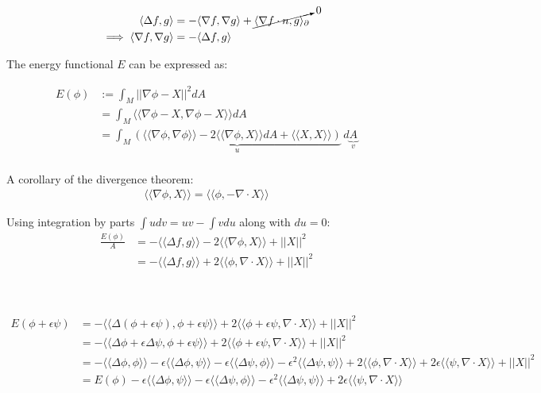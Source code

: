 \documentclass{article}
\def\grad{\nabla}
\def\lap{\Delta}
\def\nt{\notag}
\def\ll{\langle\langle}
\def\rr{\rangle\rangle}
\begin{document}
\begin{align}
    \langle \lap f, g \rangle &= -\langle \grad f, \grad g \rangle + \cancelto{0}{\langle \grad f \cdot n, g \rangle_\partial} \nt\\
    \implies \langle \grad f, \grad g \rangle &= - \langle \lap f, g \rangle
\end{align}

The energy functional $E$ can be expressed as:

\begin{align*}
    E(\phi) &:= \int_M || \grad \phi - X ||^2 dA \\
        &= \int_M \ll \grad \phi - X, \grad \phi - X \rr dA \\
        &= \int_M \underbrace{(\ll \grad \phi, \grad \phi \rr - 2 \ll \grad \phi, X \rr dA + \ll X, X \rr)}_u \, d\underbrace{A}_v \\
\end{align*}

A corollary of the divergence theorem:
\begin{align}
    \ll \grad \phi, X \rr = \ll \phi, -\grad \cdot X \rr
\end{align}

Using integration by parts $\int udv = uv - \int vdu$ along with $du = 0$:
\begin{align*}
    \frac{E(\phi)}{A} &= -\ll \lap f, g \rr - 2 \ll \grad \phi, X \rr + ||X||^2 \tag*{from (1)} \\
        &= -\ll \lap f, g \rr + 2 \ll \phi, \grad \cdot X \rr + ||X||^2 \tag*{from (2)}
\end{align*}


\vspace{1.8cm}
\\\\


\begin{align*}
    E(\phi + \epsilon \psi) &= - \ll \lap (\phi + \epsilon \psi), \phi + \epsilon \psi \rr + 2 \ll \phi + \epsilon \psi, \grad \cdot X \rr + || X ||^2 \\
        &= - \ll \lap \phi + \epsilon \lap \psi, \phi + \epsilon \psi \rr + 2 \ll \phi + \epsilon \psi, \grad \cdot X \rr + || X ||^2 \\
        &= - \ll \lap \phi, \phi \rr - \epsilon \ll \lap \phi, \psi \rr - \epsilon \ll \lap \psi, \phi \rr - \epsilon^2 \ll \lap \psi, \psi \rr + 2 \ll \phi, \grad \cdot X \rr + 2 \epsilon \ll \psi, \grad \cdot X \rr + || X ||^2 \\
        &= E(\phi) - \epsilon \ll \lap \phi, \psi \rr - \epsilon \ll \lap \psi, \phi \rr - \epsilon^2 \ll \lap \psi, \psi \rr + 2 \epsilon \ll \psi, \grad \cdot X \rr
\end{align*}
\end{document}
